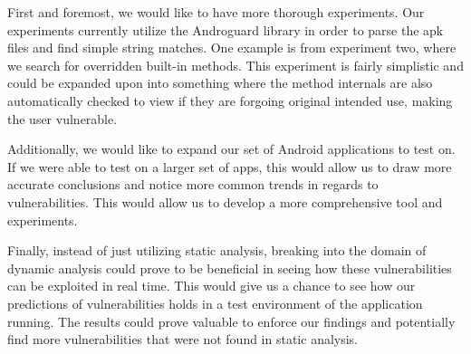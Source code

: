 First and foremost, we would like to have more thorough experiments. 
Our experiments currently utilize the Androguard library in 
order to parse the apk files and find simple string matches. 
One example is from experiment two, where we search for 
overridden built-in methods. This experiment is fairly simplistic
and could be expanded upon into something where the method 
internals are also automatically checked to view if they are 
forgoing original intended use, making the user vulnerable.

Additionally, we would like to expand our set of Android 
applications to test on. If we were able to test on a larger 
set of apps, this would allow us to draw more accurate 
conclusions and notice more common trends in regards to 
vulnerabilities. This would allow us to develop a more 
comprehensive tool and experiments. 

Finally, instead of just utilizing static analysis, breaking 
into the domain of dynamic analysis could prove to be beneficial 
in seeing how these vulnerabilities can be exploited in real time. 
This would give us a chance to see how our predictions of 
vulnerabilities holds in a test environment of the application 
running. The results could prove valuable to enforce our 
findings and potentially find more vulnerabilities that were 
not found in static analysis. 
